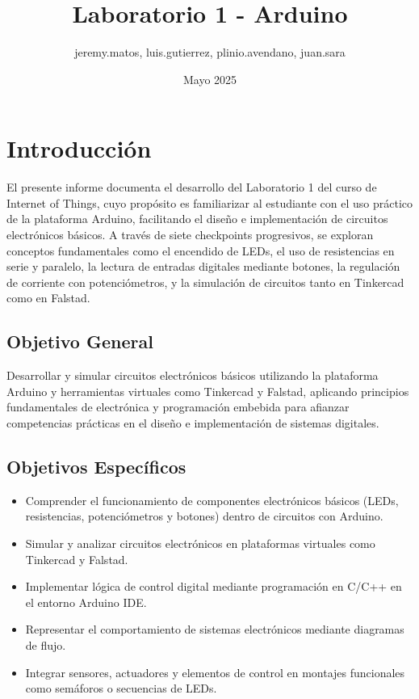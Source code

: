 \documentclass{article}
\title{Laboratorio 1 - Arduino}
\author{jeremy.matos, luis.gutierrez, plinio.avendano, juan.sara}
\date{Mayo 2025}
\begin{document}
\maketitle

\newpage
\tableofcontents
\newpage

\section{Introducción}

El presente informe documenta el desarrollo del Laboratorio 1 del curso de Internet of Things, cuyo propósito es familiarizar al estudiante con el uso práctico de la plataforma Arduino, facilitando el diseño e implementación de circuitos electrónicos básicos. A través de siete checkpoints progresivos, se exploran conceptos fundamentales como el encendido de LEDs, el uso de resistencias en serie y paralelo, la lectura de entradas digitales mediante botones, la regulación de corriente con potenciómetros, y la simulación de circuitos tanto en Tinkercad como en Falstad. 


\subsection{Objetivo General}

Desarrollar y simular circuitos electrónicos básicos utilizando la plataforma Arduino y herramientas virtuales como Tinkercad y Falstad, aplicando principios fundamentales de electrónica y programación embebida para afianzar competencias prácticas en el diseño e implementación de sistemas digitales.

\subsection{Objetivos Específicos}
\begin{itemize}
    \item Comprender el funcionamiento de componentes electrónicos básicos (LEDs, resistencias, potenciómetros y botones) dentro de circuitos con Arduino.
    \item Simular y analizar circuitos electrónicos en plataformas virtuales como Tinkercad y Falstad.
    \item Implementar lógica de control digital mediante programación en C/C++ en el entorno Arduino IDE.
    \item Representar el comportamiento de sistemas electrónicos mediante diagramas de flujo.
    \item Integrar sensores, actuadores y elementos de control en montajes funcionales como semáforos o secuencias de LEDs.
\end{itemize}
\end{document}
